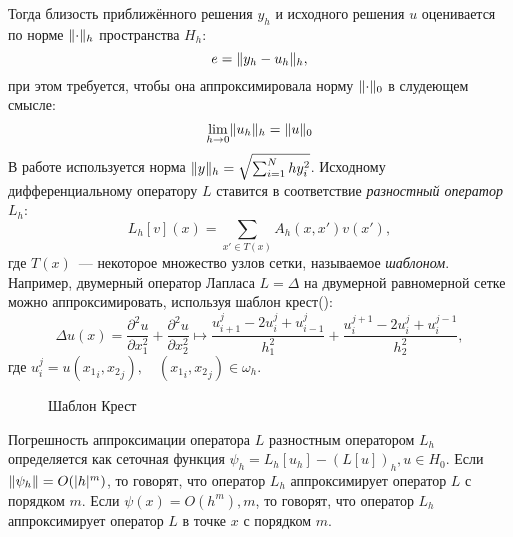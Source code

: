 Тогда близость приближённого решения $y_h$ и исходного решения $u$ оценивается по норме $\lVert\cdot\rVert_{h}$ пространства $H_h$:
\begin{equation*}
    e = \lVert y_h - u_h\rVert_{h},
\end{equation*}
при этом требуется, чтобы она аппроксимировала норму $\lVert\cdot\rVert_{0}$ в слудеющем смысле\cite{СамарскийТеорияРазностныхСхем}:
\begin{equation*}
    \lim\limits_{h \rightarrow 0} \lVert u_h\rVert_h = \lVert u\rVert_{0}
\end{equation*}
В работе используется норма
$
    \lVert y\rVert_{h} = \sqrt{
        \sum_{i=1}^{N} hy_i^2
    }
$.
Исходному дифференциальному оператору $L$ ставится в соответствие \emph{разностный оператор} $L_h$:
\begin{equation*}
    L_h[v] (x) = \sum_{x' \in T(x)} A_h(x, x') v(x'),
\end{equation*}
где $T(x)$~--- некоторое множество узлов сетки, называемое \emph{шаблоном}.
Например, двумерный оператор Лапласа $L = \Delta$ на двумерной равномерной сетке можно аппроксимировать, используя шаблон \glqq крест\grqq ():
\begin{equation*}
    \Delta u(x) = \frac{\partial^2 u}{\partial x_1^2} + \frac{\partial^2 u}{\partial x_2^2} \mapsto 
    \frac{u_{i+1}^{j} - 2u_{i}^{j} + u_{i-1}^j}{h_1^2} +
    \frac{u_i^{j + 1} - 2u_i^{j} + u_i^{j-1}}{h_2^2}, 
\end{equation*}
где $u_i^j = u({x_1}_i, {x_2}_j),\quad ({x_1}_i, {x_2}_j) \in \omega_h$.
\begin{figure}
    \centering
    \caption{Шаблон \glqq Крест\grqq}
    \label{fig:cross}
\end{figure}
Погрешность аппроксимации оператора $L$ разностным оператором $L_h$ определяется как сеточная функция $\psi_h = L_h[u_h] - (L[u])_h, u \in H_0$.
Если $\lVert\psi_h\rVert = O(|h|^m)$, то говорят, что оператор $L_h$ аппроксимирует оператор $L$ с порядком $m$.
Если $\psi(x) = O(h^m), m$, то говорят, что оператор $L_h$ аппроксимирует оператор $L$ в точке $x$ с порядком $m$.


